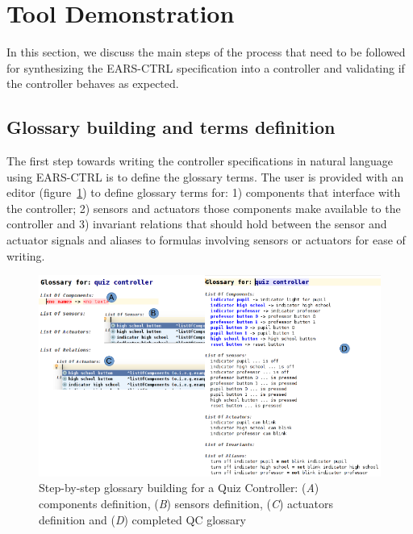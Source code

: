\vspace{-.5cm}
\section{Tool Demonstration}
\label{sec:demo}
\vspace{-.3cm}
In this section, we discuss the main steps of the process that need to be
followed for synthesizing the EARS-CTRL specification into a controller and
validating if the controller behaves as expected.
\vspace{-.3cm}
\subsection{Glossary building and terms definition}
\vspace{-.2cm}
The first step towards writing the controller specifications in natural
language using \textsf{EARS-CTRL} is to define the glossary terms. 
The user is provided with an editor
(figure~\ref{fig:glossary_def}) to define glossary terms for:
1) components that interface with the controller; 2) sensors and actuators those
components make available to the controller and 3) invariant relations
that should hold between the sensor and actuator signals and aliases to
formulas involving sensors or actuators for ease of writing.
\vspace{-.2cm}
\begin{figure}[!h]
\centering
\includegraphics[width=1\textwidth]{./images/QC_Glossary_Def.png}
\caption{Step-by-step glossary building for a Quiz Controller: (\emph{A})
components definition, (\emph{B}) sensors definition, (\emph{C}) actuators
definition and (\emph{D}) completed QC glossary}
\label{fig:glossary_def}
\vspace{-.6cm}
\end{figure}

